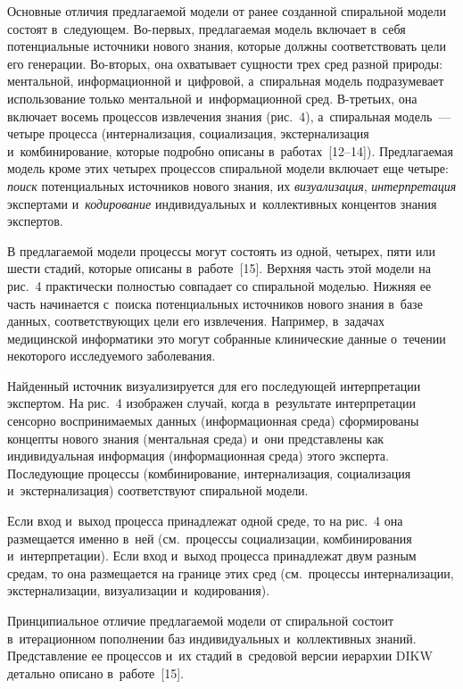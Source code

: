 \begin{multicols}{2}
  Основные отличия предлагаемой модели от ранее созданной спиральной 
модели со\-сто\-ят в~сле\-ду\-ющем. Во-пер\-вых, пред\-ла\-га\-емая модель включает 
в~себя потенциальные источники нового знания, которые долж\-ны 
соответствовать цели его генерации. Во-вто\-рых, она охватывает сущности 
трех сред разной природы: ментальной, информационной и~циф\-ро\-вой, 
а~спиральная модель подразумевает использование только ментальной 
и~информационной сред. В-треть\-их, она включает восемь процессов 
извлечения знания (рис.~4), а~спиральная модель~--- четыре процесса 
(интернализация, социализация, экстернализация и~комбинирование, которые 
по\-дроб\-но описаны в~работах~[12--14]). Пред\-ла\-га\-емая модель кроме этих 
четырех процессов спиральной модели включает еще четыре: \textit{поиск} 
потенциальных источников нового знания, их \textit{визуализация}, 
\textit{интерпретация} экспертами и~\textit{кодирование} индивидуальных 
и~коллективных концентов знания экс\-пер\-тов.
{ %

}
  
  В предлагаемой модели процессы могут со\-сто\-ять из одной, четырех, пяти 
или шести стадий, которые описаны в~работе~[15]. Верх\-няя часть этой модели 
на рис.~4 практически пол\-ностью совпадает со спиральной моделью. Ниж\-няя 
ее часть начинается с~поиска потенциальных источников нового знания в~базе 
данных, со\-от\-вет\-ст\-ву\-ющих цели его извлечения. Например, в~задачах 
медицинской информатики это могут собранные клинические данные 
о~течении некоторого ис\-сле\-ду\-емо\-го заболевания.
  
  Найденный источник визуализируется для его по\-сле\-ду\-ющей интерпретации 
экспертом. На рис.~4 изображен случай, когда в~результате интерпретации 
сенсорно воспринимаемых данных (информационная среда) сформированы 
концепты нового знания (ментальная среда) и~они пред\-став\-ле\-ны как 
индивидуальная информация (информационная среда) этого эксперта. 
По\-сле\-ду\-ющие процессы (комбинирование, интернализация, социализация 
и~экстернализация) соответствуют спиральной мо\-дели.
{

}
  
  Если вход и~выход процесса принадлежат одной среде, то на рис.~4 она 
размещается именно в~ней (см.\ процессы социализации, комбинирования 
и~интерпретации). Если вход и~выход процесса принадлежат двум разным 
средам, то она размещается на границе этих сред (см.\ процессы 
интернализации, экстернализации, визуализации и~кодирования).
  
  Принципиальное отличие пред\-ла\-га\-емой модели от спиральной со\-сто\-ит 
в~итерационном пополнении баз индивидуальных и~коллективных знаний. 
Пред\-став\-ле\-ние ее процессов и~их стадий в~средов$\acute{\mbox{о}}$й версии 
иерархии \mbox{DIKW} детально описано в~работе~[15].
{

}
\end{multicols}
